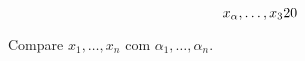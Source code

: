 \documentclass[a4paper,12pt]{article}
\begin{document}
	\[  \avec \alpha {3} {20}  \]


	
	\renewcommand{\avec}[3][x]{\ensuremath{ {#1}_{#2}, \ldots, {#1}_{#3} }}
	
	
	Compare \avec1n com \avec[\alpha]1n.
	
	
	
\end{document}
